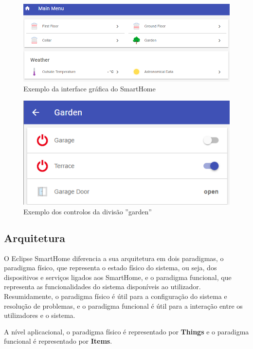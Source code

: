 \begin{itemize}
\begin{figure}[H]
  \centering
        \includegraphics[scale=0.7]{img/smarthome-gui.png}
  \caption{Exemplo da interface gráfica do SmartHome}
\end{figure}

\begin{figure}[H]
  \centering
        \includegraphics[scale=0.7]{img/smarthome-garden.png}
  \caption{Exemplo dos controlos da divisão ''garden''}
\end{figure}

\end{itemize}

\subsection{Arquitetura}

O Eclipse SmartHome diferencia a sua arquitetura em dois paradigmas, o paradigma físico, que representa o estado físico do sistema, ou seja, dos dispositivos e serviços ligados aos SmartHome, e o paradigma funcional, que representa as funcionalidades do sistema disponíveis ao utilizador. Resumidamente, o paradigma físico é útil para a configuração do sistema e resolução de problemas, e o paradigma funcional é útil para a interação entre os utilizadores e o sistema.

A nível aplicacional, o paradigma físico é representado por \textbf{Things} e o paradigma funcional é representado por \textbf{Items}. 

